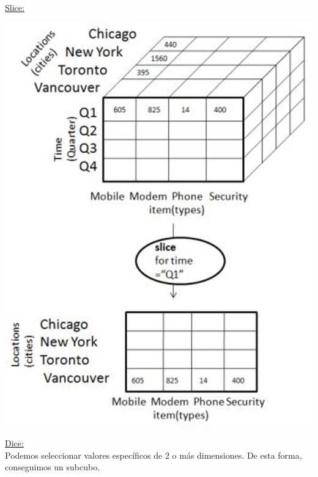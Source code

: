 \documentclass{fancyslides}
\begin{document}
\begin{frame}
\misc
{
  \underline{Slice:}
  \begin{center}
  \includegraphics[scale=0.15]{slice}
  \end{center}
}
\end{frame}


\begin{frame}
\misc
{
  \underline{Dice:}\\
  Podemos seleccionar valores específicos de 2 o más dimensiones. De esta forma, conseguimos un subcubo.
}
\end{frame}
\end{document}
